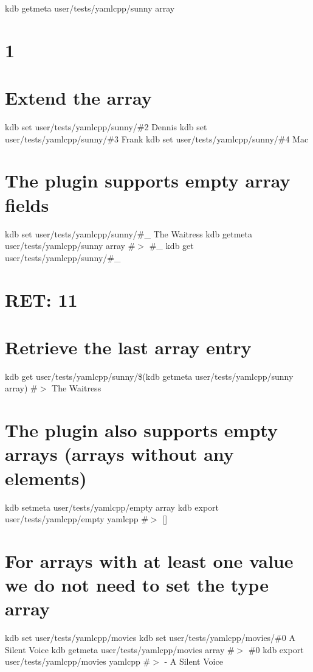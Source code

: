 kdb getmeta user/tests/yamlcpp/sunny array \section*{1}

\section*{Extend the array}

kdb set user/tests/yamlcpp/sunny/\#2 Dennis kdb set user/tests/yamlcpp/sunny/\#3 Frank kdb set user/tests/yamlcpp/sunny/\#4 Mac

\section*{The plugin supports empty array fields}

kdb set user/tests/yamlcpp/sunny/\#\+\_ \textquotesingle{}The Waitress\textquotesingle{} kdb getmeta user/tests/yamlcpp/sunny array \#$>$ \#\+\_ kdb get user/tests/yamlcpp/sunny/\#\+\_ \section*{R\+ET\+: 11}

\section*{Retrieve the last array entry}

kdb get user/tests/yamlcpp/sunny/\$(kdb getmeta user/tests/yamlcpp/sunny array) \#$>$ The Waitress

\section*{The plugin also supports empty arrays (arrays without any elements)}

kdb setmeta user/tests/yamlcpp/empty array \textquotesingle{}\textquotesingle{} kdb export user/tests/yamlcpp/empty yamlcpp \#$>$ \mbox{[}\mbox{]}

\section*{For arrays with at least one value we do not need to set the type {\ttfamily array}}

kdb set user/tests/yamlcpp/movies kdb set user/tests/yamlcpp/movies/\#0 \textquotesingle{}A Silent Voice\textquotesingle{} kdb getmeta user/tests/yamlcpp/movies array \#$>$ \#0 kdb export user/tests/yamlcpp/movies yamlcpp \#$>$ -\/ A Silent Voice

